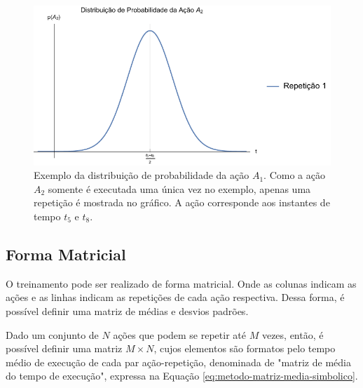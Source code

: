 \begin{figure}[htb]
	\caption{\label{fig:metodo-exemplo-bo-media-a2} Exemplo da distribuição de probabilidade da ação $A_1$. Como a ação $A_2$ somente é executada uma única vez no exemplo, apenas uma repetição é mostrada no gráfico. A ação corresponde aos instantes de tempo $t_5$ e $t_8$.}
	\begin{center}
	    \includegraphics[width=\linewidth]{../Mathematica/Images/Exemplo_BO_Media_A2.pdf}
	\end{center}
\end{figure}

			\subsection{Forma Matricial}
O treinamento pode ser realizado de forma matricial. Onde as colunas indicam as ações e as linhas indicam as repetições de cada ação respectiva. Dessa forma, é possível definir uma matriz de médias e desvios padrões.

Dado um conjunto de $N$ ações que podem se repetir até $M$ vezes, então, é possível definir uma matriz $M \times N$, cujos elementos são formatos pelo tempo médio de execução de cada par ação-repetição, denominada de "matriz de média do tempo de execução", expressa na Equação \ref{eq:metodo-matriz-media-simbolico}.

\newcommand{\RogielBOMatrix}[1]{
	\ensuremath{
		\left(\begin{array}{cccc}
 			{#1}_{A_1,1} & {#1}_{A_2,1} & \cdots & {#1}_{A_N,1} \\
 			{#1}_{A_1,2} & {#1}_{A_2,2} & \cdots & {#1}_{A_N,2} \\
 			\vdots 		 & \vdots 	    & \ddots & \vdots 		\\
 			{#1}_{A_1,M} & {#1}_{A_2,M} & \cdots & {#1}_{A_N,M}
		\end{array}\right)
	}
}

